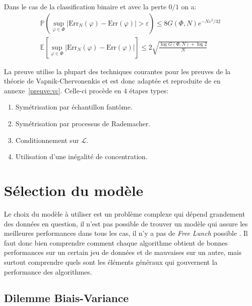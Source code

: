 \begin{theoreme}\label{thrm:vc}
    Dans le cas de la classification binaire et avec la perte $0/1$ on a:
    \begin{align}
        &\mathbb{P} \left( \sup_{\varphi \in \Phi} \vert \mathrm{Err}_N ( \varphi ) - \mathrm{Err} ( \varphi ) \vert > \varepsilon \right) \leq 8 G(\Phi,N) e^{-N \varepsilon^2 / 32} \\
        &\mathbb{E} \left[ \sup_{\varphi \in \Phi} \vert \mathrm{Err}_N ( \varphi ) - \mathrm{Err} ( \varphi ) \vert \right] \leq 2 \sqrt{\frac{\log G(\Phi,N) + \log 2 }{N}}
    \end{align}
\end{theoreme}

\begin{hproof}
    La preuve utilise la plupart des techniques courantes pour les preuves de la théorie de Vapnik-Chervonenkis et est donc adaptée et reproduite de \citet{Devroye1997} en annexe~\ref{preuve:vc}. Celle-ci procède en $4$ étapes types:
    \begin{enumerate}
        \item Symétrisation par échantillon fantôme.
        \item Symétrisation par processus de Rademacher.
        \item Conditionnement sur $\mathcal{L}$.
        \item Utilisation d'une inégalité de concentration.
    \end{enumerate}
\end{hproof}

\section{Sélection du modèle}

Le choix du modèle à utiliser est un problème complexe qui dépend grandement des données en question, il n'est pas possible de trouver un modèle qui assure les meilleures performances dans tous les cas, il n'y a pas de \emph{Free Lunch} possible \citep{Wolpert1996}. Il faut donc bien comprendre comment chaque algorithme obtient de bonnes performances sur un certain jeu de données et de mauvaises sur un autre, mais surtout comprendre quels sont les éléments généraux qui gouvernent la performance des algorithmes.

\subsection{Dilemme Biais-Variance}


